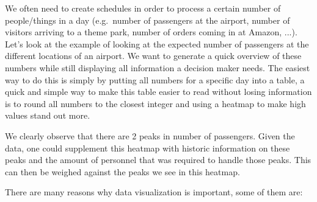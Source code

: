 \documentclass[10pt]{extarticle}
\newcommand{\<}{\langle}
\renewcommand{\>}{\rangle}
\theoremstyle{mystyle}{\newtheorem*{remark}{Remark}}
\theoremstyle{mystyle}{\newtheorem*{remarks}{Remarks}}
\theoremstyle{mystyle}{\newtheorem*{example}{Example}}
\theoremstyle{mystyle}{\newtheorem*{examples}{Examples}}
\theoremstyle{definition}{\newtheorem*{exercise}{Exercise}}
\theoremstyle{warn}
\begin{document}
\begin{example}
We often need to create schedules in order to process a certain number of people/things in a day (e.g.~number of passengers at the airport, number of visitors arriving to a theme park, number of orders coming in at Amazon, ...). Let's look at the example of looking at the expected number of passengers at the different locations of an airport. We want to generate a quick overview of these numbers while still displaying all information a decision maker needs. The easiest way to do this is simply by putting all numbers for a specific day into a table, a quick and simple way to make this table easier to read without losing information is to round all numbers to the closest integer and using a heatmap to make high values stand out more.

We clearly observe that there are 2 peaks in number of passengers. Given the data, one could supplement this heatmap with historic information on these peaks and the amount of personnel that was required to handle those peaks. This can then be weighed against the peaks we see in this heatmap.
\end{example}
There are many reasons why data visualization is important, some of them are:
\end{document}
